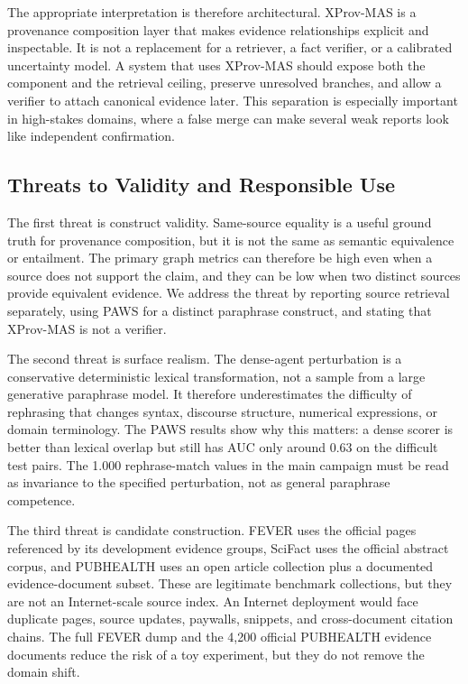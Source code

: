 \documentclass{ieeeaccess}
\begin{document}
The appropriate interpretation is therefore architectural. XProv-MAS is a provenance composition layer that makes evidence relationships explicit and inspectable. It is not a replacement for a retriever, a fact verifier, or a calibrated uncertainty model. A system that uses XProv-MAS should expose both the component and the retrieval ceiling, preserve unresolved branches, and allow a verifier to attach canonical evidence later. This separation is especially important in high-stakes domains, where a false merge can make several weak reports look like independent confirmation.

\subsection{Threats to Validity and Responsible Use}
The first threat is construct validity. Same-source equality is a useful ground truth for provenance composition, but it is not the same as semantic equivalence or entailment. The primary graph metrics can therefore be high even when a source does not support the claim, and they can be low when two distinct sources provide equivalent evidence. We address the threat by reporting source retrieval separately, using PAWS for a distinct paraphrase construct, and stating that XProv-MAS is not a verifier.

The second threat is surface realism. The dense-agent perturbation is a conservative deterministic lexical transformation, not a sample from a large generative paraphrase model. It therefore underestimates the difficulty of rephrasing that changes syntax, discourse structure, numerical expressions, or domain terminology. The PAWS results show why this matters: a dense scorer is better than lexical overlap but still has AUC only around 0.63 on the difficult test pairs. The 1.000 rephrase-match values in the main campaign must be read as invariance to the specified perturbation, not as general paraphrase competence.

The third threat is candidate construction. FEVER uses the official pages referenced by its development evidence groups, SciFact uses the official abstract corpus, and PUBHEALTH uses an open article collection plus a documented evidence-document subset. These are legitimate benchmark collections, but they are not an Internet-scale source index. An Internet deployment would face duplicate pages, source updates, paywalls, snippets, and cross-document citation chains. The full FEVER dump and the 4,200 official PUBHEALTH evidence documents reduce the risk of a toy experiment, but they do not remove the domain shift.
\end{document}
